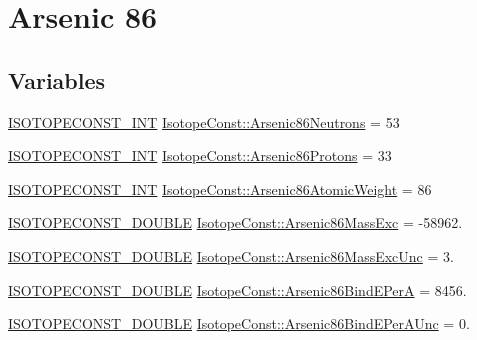 \hypertarget{group___isotope_const-_arsenic-_as86}{}\section{Arsenic 86}
\label{group___isotope_const-_arsenic-_as86}
\subsection*{Variables}
\begin{DoxyCompactItemize}
\item 
\mbox{\hyperlink{group___isotope_const-_macros_ga5f18360b3e99483a35c32d789e62621c}{I\+S\+O\+T\+O\+P\+E\+C\+O\+N\+S\+T\+\_\+\+I\+NT}} \mbox{\hyperlink{group___isotope_const-_arsenic-_as86_gad6d1ac86a5fe3073d5f1ae64c6dd7dc9}{Isotope\+Const\+::\+Arsenic86\+Neutrons}} = 53
\item 
\mbox{\hyperlink{group___isotope_const-_macros_ga5f18360b3e99483a35c32d789e62621c}{I\+S\+O\+T\+O\+P\+E\+C\+O\+N\+S\+T\+\_\+\+I\+NT}} \mbox{\hyperlink{group___isotope_const-_arsenic-_as86_gad1b0441b1de1f26724ad36bb4153f8bc}{Isotope\+Const\+::\+Arsenic86\+Protons}} = 33
\item 
\mbox{\hyperlink{group___isotope_const-_macros_ga5f18360b3e99483a35c32d789e62621c}{I\+S\+O\+T\+O\+P\+E\+C\+O\+N\+S\+T\+\_\+\+I\+NT}} \mbox{\hyperlink{group___isotope_const-_arsenic-_as86_ga270ebfdf267f90df91018f307014ab83}{Isotope\+Const\+::\+Arsenic86\+Atomic\+Weight}} = 86
\item 
\mbox{\hyperlink{group___isotope_const-_macros_ga8f45a7272ce02c0b4c65c44636ed719a}{I\+S\+O\+T\+O\+P\+E\+C\+O\+N\+S\+T\+\_\+\+D\+O\+U\+B\+LE}} \mbox{\hyperlink{group___isotope_const-_arsenic-_as86_gaa8f02ab304713145f913e9a8b10a933b}{Isotope\+Const\+::\+Arsenic86\+Mass\+Exc}} = -\/58962.
\item 
\mbox{\hyperlink{group___isotope_const-_macros_ga8f45a7272ce02c0b4c65c44636ed719a}{I\+S\+O\+T\+O\+P\+E\+C\+O\+N\+S\+T\+\_\+\+D\+O\+U\+B\+LE}} \mbox{\hyperlink{group___isotope_const-_arsenic-_as86_ga8e15840999bdfb57d2323812dfcb002f}{Isotope\+Const\+::\+Arsenic86\+Mass\+Exc\+Unc}} = 3.
\item 
\mbox{\hyperlink{group___isotope_const-_macros_ga8f45a7272ce02c0b4c65c44636ed719a}{I\+S\+O\+T\+O\+P\+E\+C\+O\+N\+S\+T\+\_\+\+D\+O\+U\+B\+LE}} \mbox{\hyperlink{group___isotope_const-_arsenic-_as86_gaac9efb273083e4116c9d881861365318}{Isotope\+Const\+::\+Arsenic86\+Bind\+E\+PerA}} = 8456.
\item 
\mbox{\hyperlink{group___isotope_const-_macros_ga8f45a7272ce02c0b4c65c44636ed719a}{I\+S\+O\+T\+O\+P\+E\+C\+O\+N\+S\+T\+\_\+\+D\+O\+U\+B\+LE}} \mbox{\hyperlink{group___isotope_const-_arsenic-_as86_gad4b0e8ae7ed24018acae79dd77306714}{Isotope\+Const\+::\+Arsenic86\+Bind\+E\+Per\+A\+Unc}} = 0.

\end{DoxyCompactItemize}
